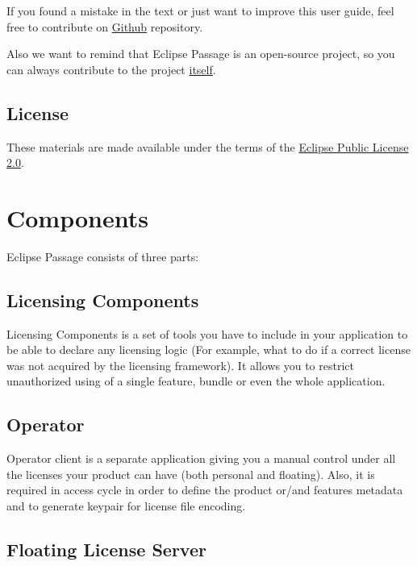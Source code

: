 \documentclass[12pt]{report}
\begin{document}
If you found a mistake in the text or just want to improve this user guide, feel free to contribute on \href{https://github.com/eclipse-passage/passage-docs}{Github} repository.

Also we want to remind that Eclipse Passage is an open-source project, so you can always contribute to the project \href{https://github.com/eclipse-passage/passage}{itself}.

\section*{License}

These materials are made available under the terms of the \href{https://www.eclipse.org/legal/epl-2.0/}{Eclipse Public License 2.0}.

\chapter*{Components}

Eclipse Passage consists of three parts:

\section*{Licensing Components}

Licensing Components is a set of tools you have to include in your application to be able to declare any licensing logic (For example, what to do if a correct license was not acquired by the licensing framework).
It allows you to restrict unauthorized using of a single feature, bundle or even the whole application.

\section*{Operator}

Operator client is a separate application giving you a manual control under all the licenses your product can have (both personal and floating). Also, it is required
in access cycle in order to define the product or/and features metadata and to generate keypair for license file encoding.

\section*{Floating License Server}
\end{document}
